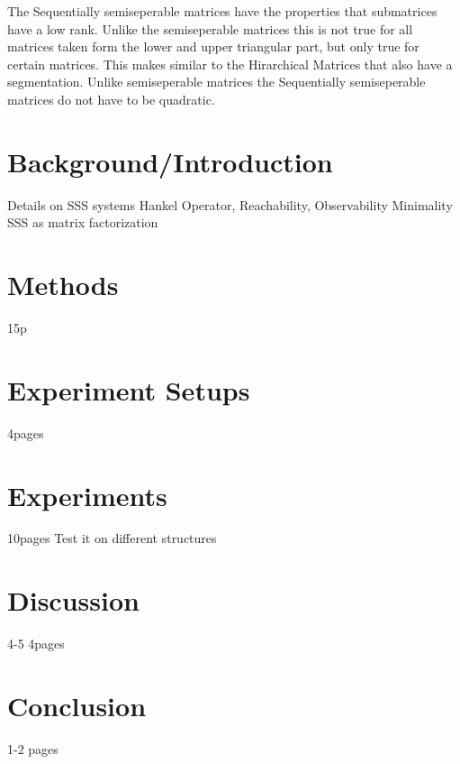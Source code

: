\documentclass[doctype=mastersthesis,BCOR=15mm,biblatex]{ldvbook}%
\begin{document}
The Sequentially semiseperable matrices have the properties that submatrices have a low rank.
Unlike the semiseperable matrices this is not true for all matrices taken form the lower and upper triangular part, but only true for certain matrices.
This makes similar to the Hirarchical Matrices that also have a segmentation.
Unlike semiseperable matrices the Sequentially semiseperable matrices do not have to be quadratic. 

\chapter{Background/Introduction}\label{chap:background}

Details on SSS systems
Hankel Operator, Reachability, Observability
Minimality
SSS as matrix factorization


\chapter{Methods} 15p

\chapter{Experiment Setups}
4pages

\chapter{Experiments}
10pages
Test it on different structures

\chapter{Discussion}
4-5 4pages

\chapter{Conclusion}
1-2 pages







\printbibliography{}
\end{document}
